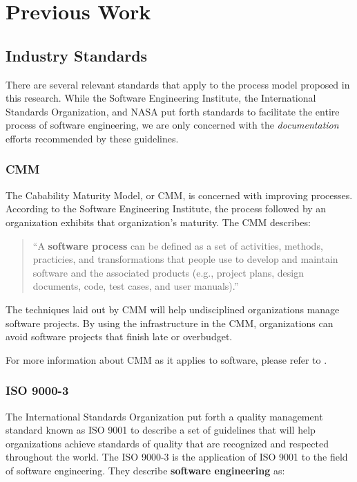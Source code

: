 \section{Previous Work}\label{previous}

\subsection{Industry Standards}
There are several relevant standards that apply to the process model proposed in
this research. While the Software Engineering Institute, the International
Standards Organization, and NASA put forth standards to facilitate the entire
process of software engineering, we are only concerned with the 
\textit{documentation} efforts recommended by these guidelines.

\subsubsection{CMM}
The Cabability Maturity Model, or CMM, is concerned with improving processes.
According to the Software Engineering Institute, the process followed by an
organization exhibits that organization's maturity. The CMM describes:

\begin{quote}\label{process}
``A \textbf{software process} can be defined as a set of activities, methods,
practicies, and transformations that people use to develop and maintain software
and the associated products (e.g., project plans, design documents, code, test
cases, and user manuals).'' \cite{CMM11}
\end{quote}

The techniques laid out by CMM will help undisciplined organizations manage
software projects. By using the infrastructure in the CMM, organizations can 
avoid software projects that finish late or overbudget.

For more information about CMM as it applies to software, please refer to
\cite{CMM11}.

\subsubsection{ISO 9000-3}
The International Standards Organization put forth a quality management standard
known as ISO 9001 to describe a set of guidelines that will help organizations
achieve standards of quality that are recognized and respected throughout the
world. The ISO 9000-3 is the application of ISO 9001 to the field of software
engineering. They describe \textbf{software engineering} as: 

